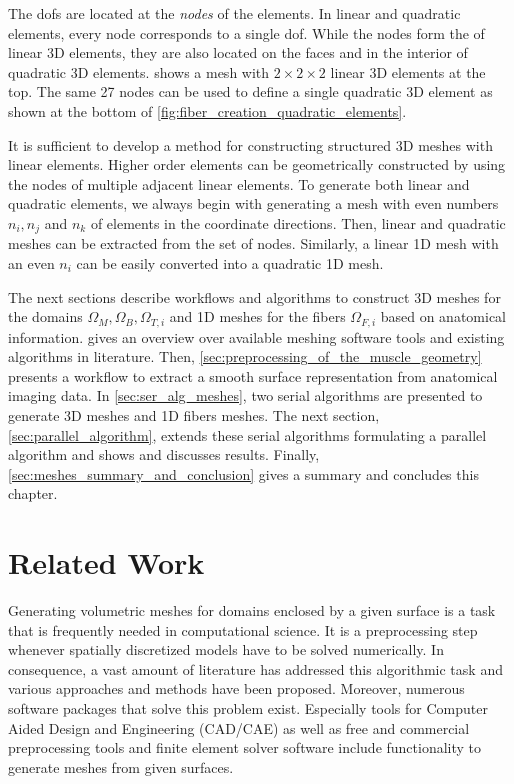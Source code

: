 The dofs are located at the \emph{nodes} of the elements. In linear and quadratic elements, every node corresponds to a single dof. While the nodes form the  of linear 3D elements, they are also located on the faces and in the interior of quadratic 3D elements.  shows a mesh with $2 \times 2 \times 2$ linear 3D elements at the top. The same 27 nodes can be used to define a single quadratic 3D element as shown at the bottom of \cref{fig:fiber_creation_quadratic_elements}. 

It is sufficient to develop a method for constructing structured 3D meshes with linear elements. 
Higher order elements can be geometrically constructed by using the nodes of multiple adjacent linear elements.
To generate both linear and quadratic elements, we always begin with generating a mesh with even numbers $n_i,n_j$ and $n_k$ of elements in the coordinate directions. Then, linear and quadratic meshes can be extracted from the set of nodes. Similarly, a linear 1D mesh with an even $n_i$ can be easily converted into a quadratic 1D mesh.

The next sections describe workflows and algorithms to construct 3D meshes for the domains $\Omega_M,\Omega_B,\Omega_{T,i}$ and 1D meshes for the fibers $\Omega_{F,i}$ based on anatomical information.  gives an overview over available meshing software tools and existing algorithms in literature. Then, \cref{sec:preprocessing_of_the_muscle_geometry} presents a workflow to extract a smooth surface representation from anatomical imaging data. In \cref{sec:ser_alg_meshes}, two serial algorithms are presented to generate 3D meshes and 1D fibers meshes. The next section, \cref{sec:parallel_algorithm}, extends these serial algorithms formulating a parallel algorithm and shows and discusses results. Finally, \cref{sec:meshes_summary_and_conclusion} gives a summary and concludes this chapter.

\section{Related Work}\label{sec:fiber_meshes_related_works}

Generating volumetric meshes for domains enclosed by a given surface is a task that is frequently needed in computational science. It is a preprocessing step whenever spatially discretized models have to be solved numerically. In consequence, a vast amount of literature has addressed this algorithmic task and various approaches and methods have been proposed. Moreover, numerous software packages that solve this problem exist. Especially tools for Computer Aided Design and Engineering (CAD/CAE) as well as free and commercial preprocessing tools and finite element solver software include functionality to generate meshes from given surfaces.

